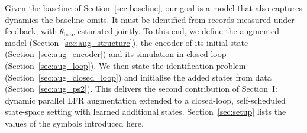 Given the baseline of Section~\ref{sec:baseline}, our goal is a model that also
captures dynamics the baseline omits.
It must be identified from records measured under feedback, with
$\theta_{\mathrm{base}}$ estimated jointly.
To this end, we define the augmented model (Section~\ref{sec:aug_structure}),
the encoder of its initial state (Section~\ref{sec:aug_encoder}) and its
simulation in closed loop (Section~\ref{sec:aug_loop}).
We then state the identification problem (Section~\ref{sec:aug_closed_loop})
and initialise the added states from data (Section~\ref{sec:aug_ps2}).
This delivers the second contribution of Section~I: dynamic parallel LFR
augmentation extended to a closed-loop, self-scheduled state-space setting
with learned additional states.
Section~\ref{sec:setup} lists the values of the symbols introduced here.

